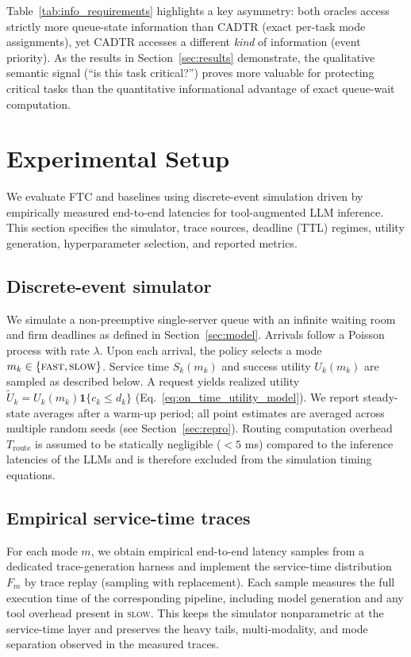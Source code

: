 \documentclass[preprint,12pt]{elsarticle}
\begin{document}
Table~\ref{tab:info_requirements} highlights a key asymmetry: both oracles access strictly more queue-state information than CADTR (exact per-task mode assignments), yet CADTR accesses a different \emph{kind} of information (event priority). As the results in Section~\ref{sec:results} demonstrate, the qualitative semantic signal (``is this task critical?'') proves more valuable for protecting critical tasks than the quantitative informational advantage of exact queue-wait computation.

\section{Experimental Setup}
\label{sec:exp_setup}

We evaluate FTC and baselines using discrete-event simulation driven by empirically measured end-to-end latencies for tool-augmented LLM inference. This section specifies the simulator, trace sources, deadline (TTL) regimes, utility generation, hyperparameter selection, and reported metrics.

\subsection{Discrete-event simulator}
\label{sec:simulator}

We simulate a non-preemptive single-server queue with an infinite waiting room and firm deadlines as defined in Section~\ref{sec:model}. Arrivals follow a Poisson process with rate $\lambda$. Upon each arrival, the policy selects a mode $m_k \in \{\textsc{fast},\textsc{slow}\}$. Service time $S_k(m_k)$ and success utility $U_k(m_k)$ are sampled as described below. A request yields realized utility $\tilde{U}_k = U_k(m_k)\mathbf{1}\{c_k \le d_k\}$ (Eq.~\eqref{eq:on_time_utility_model}). We report steady-state averages after a warm-up period; all point estimates are averaged across multiple random seeds (see Section~\ref{sec:repro}). Routing computation overhead $T_{\text{route}}$ is assumed to be statically negligible ($< 5$ ms) compared to the inference latencies of the LLMs and is therefore excluded from the simulation timing equations.

\subsection{Empirical service-time traces}
\label{sec:service_traces}

For each mode $m$, we obtain empirical end-to-end latency samples from a dedicated trace-generation harness and implement the service-time distribution $F_m$ by trace replay (sampling with replacement). Each sample measures the full execution time of the corresponding pipeline, including model generation and any tool overhead present in \textsc{slow}. This keeps the simulator nonparametric at the service-time layer and preserves the heavy tails, multi-modality, and mode separation observed in the measured traces.
\end{document}
